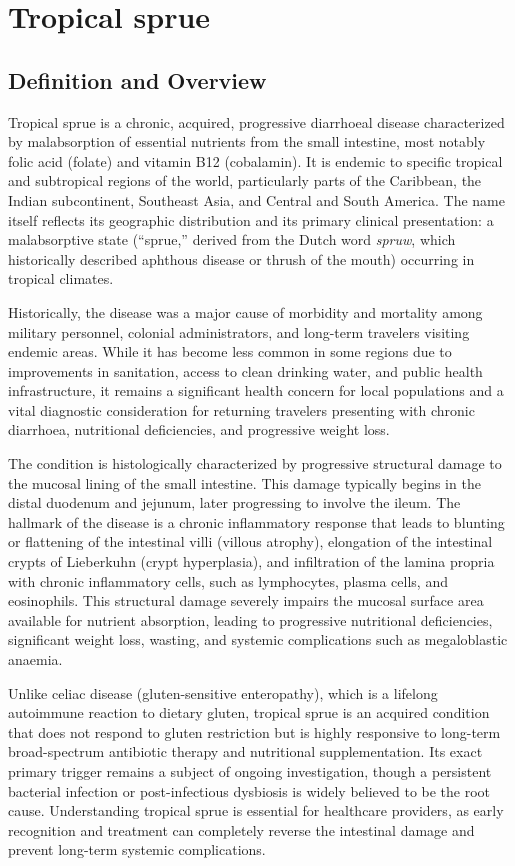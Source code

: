 \chapter{Tropical sprue}

\section*{Definition and Overview}
Tropical sprue is a chronic, acquired, progressive diarrhoeal disease characterized by malabsorption of essential nutrients from the small intestine, most notably folic acid (folate) and vitamin B12 (cobalamin). It is endemic to specific tropical and subtropical regions of the world, particularly parts of the Caribbean, the Indian subcontinent, Southeast Asia, and Central and South America. The name itself reflects its geographic distribution and its primary clinical presentation: a malabsorptive state (``sprue,'' derived from the Dutch word \textit{spruw}, which historically described aphthous disease or thrush of the mouth) occurring in tropical climates.

Historically, the disease was a major cause of morbidity and mortality among military personnel, colonial administrators, and long-term travelers visiting endemic areas. While it has become less common in some regions due to improvements in sanitation, access to clean drinking water, and public health infrastructure, it remains a significant health concern for local populations and a vital diagnostic consideration for returning travelers presenting with chronic diarrhoea, nutritional deficiencies, and progressive weight loss.

The condition is histologically characterized by progressive structural damage to the mucosal lining of the small intestine. This damage typically begins in the distal duodenum and jejunum, later progressing to involve the ileum. The hallmark of the disease is a chronic inflammatory response that leads to blunting or flattening of the intestinal villi (villous atrophy), elongation of the intestinal crypts of Lieberkuhn (crypt hyperplasia), and infiltration of the lamina propria with chronic inflammatory cells, such as lymphocytes, plasma cells, and eosinophils. This structural damage severely impairs the mucosal surface area available for nutrient absorption, leading to progressive nutritional deficiencies, significant weight loss, wasting, and systemic complications such as megaloblastic anaemia.

Unlike celiac disease (gluten-sensitive enteropathy), which is a lifelong autoimmune reaction to dietary gluten, tropical sprue is an acquired condition that does not respond to gluten restriction but is highly responsive to long-term broad-spectrum antibiotic therapy and nutritional supplementation. Its exact primary trigger remains a subject of ongoing investigation, though a persistent bacterial infection or post-infectious dysbiosis is widely believed to be the root cause. Understanding tropical sprue is essential for healthcare providers, as early recognition and treatment can completely reverse the intestinal damage and prevent long-term systemic complications.

